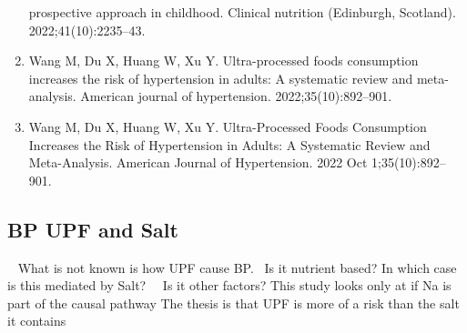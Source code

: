 \documentclass[
]{article}
\begin{document}
\begin{enumerate}
  prospective approach in childhood. Clinical nutrition (Edinburgh,
  Scotland). 2022;41(10):2235--43.
\item
  Wang M, Du X, Huang W, Xu Y. Ultra-processed foods consumption
  increases the risk of hypertension in adults: A systematic review and
  meta-analysis. American journal of hypertension. 2022;35(10):892--901.
\item
  Wang M, Du X, Huang W, Xu Y. Ultra-Processed Foods Consumption
  Increases the Risk of Hypertension in Adults: A Systematic Review and
  Meta-Analysis. American Journal of Hypertension. 2022 Oct
  1;35(10):892--901.
\end{enumerate}

\hypertarget{bp-upf-and-salt}{%
\subsection{BP UPF and Salt~}\label{bp-upf-and-salt}}

~ What is not known is how UPF cause BP.~ Is it nutrient based? In which
case is this mediated by Salt?~~ Is it other factors? This study looks
only at if Na is part of the causal pathway The thesis is that UPF is
more of a risk than the salt it contains
\end{document}
